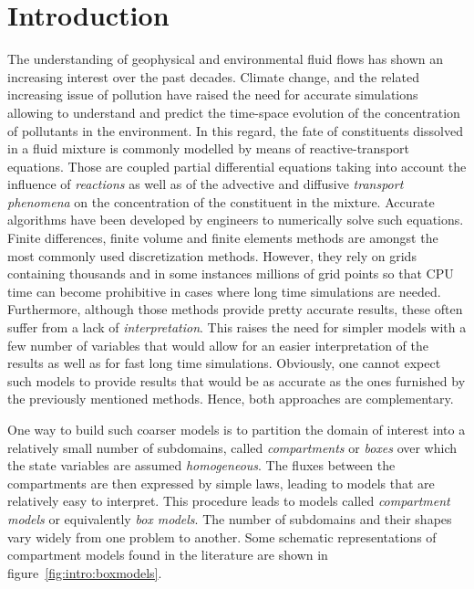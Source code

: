 \chapter*{Introduction}
The understanding of geophysical and environmental fluid flows has shown an increasing interest over the past decades. Climate change, and the related increasing issue of pollution have raised the need for accurate simulations allowing to understand and predict the time-space evolution of the concentration of pollutants in the environment. In this regard, the fate of constituents dissolved in a fluid mixture is commonly modelled by means of reactive-transport equations. Those are coupled partial differential equations taking into account the influence of \textit{reactions} as well as of the advective and diffusive \textit{transport phenomena} on the concentration of the constituent in the mixture. Accurate algorithms have been developed by engineers to numerically solve such equations. Finite differences, finite volume and finite elements methods are amongst the most commonly used discretization methods. However, they rely on grids containing thousands and in some instances millions of grid points so that CPU time can become prohibitive in cases where long time simulations are needed. Furthermore, although those methods provide pretty accurate results, these often suffer from a lack of \textit{interpretation}. This raises the need for simpler models with a few number of variables that would allow for an easier interpretation of the results as well as for fast long time simulations. Obviously, one cannot expect such models to provide results that would be as accurate as the ones furnished by the previously mentioned methods. Hence, both approaches are complementary. 

One way to build such coarser models is to partition the domain of interest into a relatively small number of subdomains, called \textit{compartments} or \textit{boxes} over which the state variables are assumed \textit{homogeneous}. The fluxes between the compartments are then expressed by simple laws, leading to models that are relatively easy to interpret. This procedure leads to models called \textit{compartment models} or equivalently \textit{box models}. The number of subdomains and their shapes vary widely from one problem to another. Some schematic representations of compartment models found in the literature are shown in figure~\ref{fig:intro:boxmodels}.

